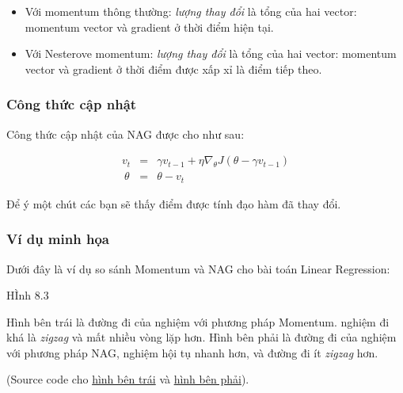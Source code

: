 \begin{itemize}
\item Với momentum thông thường: \textit{lượng thay đổi} là tổng của hai vector: momentum vector và gradient ở thời điểm hiện tại. 
 
\item Với Nesterove momentum: \textit{lượng thay đổi} là tổng của hai vector: momentum vector và gradient ở thời điểm được xấp xỉ là điểm tiếp theo.  
\end{itemize}
 
 
\subsubsection{Công thức cập nhật}
 
Công thức cập nhật của NAG được cho như sau: 
 
\begin{eqnarray} 
v_{t} &=& \gamma v_{t-1} + \eta \nabla_{\theta}J(\theta - \gamma v_{t-1}) \\\ 
\theta &=& \theta -  v_{t} 
\end{eqnarray} 
 
Để ý một chút các bạn sẽ thấy điểm được tính đạo hàm đã thay đổi.  
 
 
\subsubsection{Ví dụ minh họa }
 
Dưới đây là ví dụ so sánh Momentum và NAG cho bài toán Linear Regression: 
 
{\color{red} HÌnh 8.3} 
 
Hình bên trái là đường đi của nghiệm với phương pháp Momentum. nghiệm đi khá là \textit{zigzag} và mất nhiều vòng lặp hơn. Hình bên phải là đường đi của nghiệm với phương pháp NAG, nghiệm hội tụ nhanh hơn, và đường đi ít \textit{zigzag} hơn.  
 
(Source code cho \href{https://github.com/tiepvupsu/tiepvupsu.github.io/blob/master/assets/GD/LR%20Momentum.ipynb}{hình bên trái} và \href{https://github.com/tiepvupsu/tiepvupsu.github.io/blob/master/assets/GD/LR%20NAG.ipynb}{ hình bên phải}). 
 
